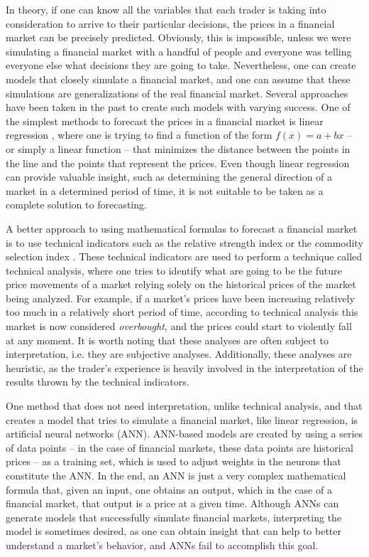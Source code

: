\documentclass[10pt,letterpaper]{article}
\begin{document}
In theory, if one can know all the variables that each trader is taking into consideration to arrive to their particular decisions, the prices in a financial market can be precisely predicted. Obviously, this is impossible, unless we were simulating a financial market with a handful of people and everyone was telling everyone else what decisions they are going to take. Nevertheless, one can create models that closely simulate a financial market, and one can assume that these simulations are generalizations of the real financial market. Several approaches have been taken in the past to create such models with varying success. One of the simplest methods to forecast the prices in a financial market is linear regression \cite{kutner2004applied}, where one is trying to find a function of the form $f(x) = a + bx$ -- or simply a linear function -- that minimizes the distance between the points in the line and the points that represent the prices. Even though linear regression can provide valuable insight, such as determining the general direction of a market in a determined period of time, it is not suitable to be taken as a complete solution to forecasting.

A better approach to using mathematical formulas to forecast a financial market is to use technical indicators such as the relative strength index or the commodity selection index \cite{Wilder1978}. These technical indicators are used to perform a technique called technical analysis, where one tries to identify what are going to be the future price movements of a market relying solely on the historical prices of the market being analyzed. For example, if a market's prices have been increasing relatively too much in a relatively short period of time, according to technical analysis this market is now considered \textit{overbought}, and the prices could start to violently fall at any moment. It is worth noting that these analyses are often subject to interpretation, i.e. they are subjective analyses. Additionally, these analyses are heuristic, as the trader's experience is heavily involved in the interpretation of the results thrown by the technical indicators.

One method that does not need interpretation, unlike technical analysis, and that creates a model that tries to simulate a financial market, like linear regression, is artificial neural networks (ANN). ANN-based models are created by using a series of data points -- in the case of financial markets, these data points are historical prices -- as a training set, which is used to adjust weights in the neurons that constitute the ANN. In the end, an ANN is just a very complex mathematical formula that, given an input, one obtains an output, which in the case of a financial market, that output is a price at a given time. Although ANNs can generate models that successfully simulate financial markets, interpreting the model is sometimes desired, as one can obtain insight that can help to better understand a market's behavior, and ANNs fail to accomplish this goal.
\end{document}
